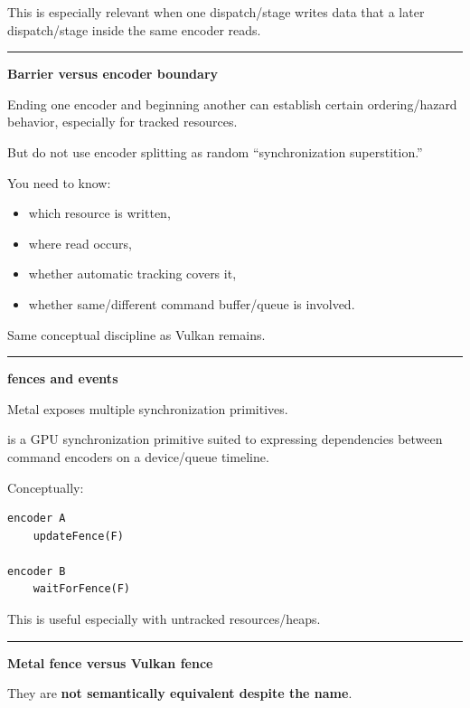 This is especially relevant when one dispatch/stage writes data that a later dispatch/stage inside the same encoder reads.

\begin{center}\rule{0.5\linewidth}{0.5pt}\end{center}

\textbf{Barrier versus encoder boundary}

Ending one encoder and beginning another can establish certain ordering/hazard behavior, especially for tracked resources.

But do not use encoder splitting as random ``synchronization superstition.''

You need to know:

\begin{itemize}
\tightlist
\item
  which resource is written,
\item
  where read occurs,
\item
  whether automatic tracking covers it,
\item
  whether same/different command buffer/queue is involved.
\end{itemize}

Same conceptual discipline as Vulkan remains.

\begin{center}\rule{0.5\linewidth}{0.5pt}\end{center}

\textbf{fences and events}

Metal exposes multiple synchronization primitives.

 is a GPU synchronization primitive suited to expressing dependencies between command encoders on a device/queue timeline.

Conceptually:

\begin{verbatim}
encoder A
    updateFence(F)

encoder B
    waitForFence(F)
\end{verbatim}

This is useful especially with untracked resources/heaps.

\begin{center}\rule{0.5\linewidth}{0.5pt}\end{center}

\textbf{Metal fence versus Vulkan fence}

They are \textbf{not semantically equivalent despite the name}.

